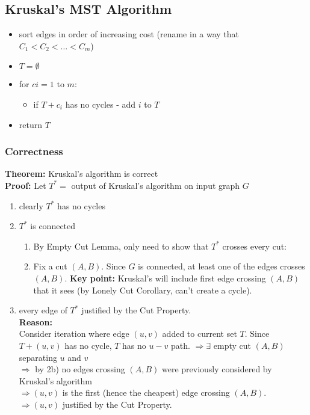 \documentclass{scrartcl}
\begin{document}
\subsection{Kruskal's MST Algorithm}
\label{sec:6-1}
\begin{itemize}
\item sort edges in order of increasing cost (rename in a way that $C_1 < C_2 <
  \dots < C_m$)
\item $T = \emptyset$
\item for $ci = 1$ to $m$:
  \begin{itemize}
  \item if $T + c_i$ has no cycles - add $i$ to $T$
  \end{itemize}
\item return $T$
\end{itemize}
\subsubsection{Correctness}
\label{sec:6-2}
{\bf Theorem: } Kruskal's algorithm is correct \\
{\bf Proof: } Let $T^* = $ output of Kruskal's algorithm on input graph $G$ \\
\begin{enumerate}
\item clearly $T^*$ has no cycles
\item $T^*$ is connected
  \begin{enumerate}
  \item By Empty Cut Lemma, only need to show that $T^*$ crosses every cut:
  \item Fix a cut $(A, B)$. Since $G$ is connected, at least one of the edges
    crosses $(A, B)$. {\bf Key point: } Kruskal's will include first edge
    crossing $(A, B)$ that it sees (by Lonely Cut Corollary, can't create a
    cycle).
  \end{enumerate}
\item every edge of $T^*$ justified by the Cut Property. \\
  {\bf Reason: }  \\
  Consider iteration where edge $(u, v)$ added to current set $T$. Since $T +
  (u, v)$ has no cycle, $T$ has no $u-v$ path. $\Rightarrow \exists$ empty cut
  $(A, B)$ separating $u$ and $v$ \\
  $\Rightarrow$ by 2b) no edges crossing $(A, B)$ were previously considered by
  Kruskal's algorithm \\
  $\Rightarrow (u, v)$ is the first (hence the cheapest) edge crossing $(A, B)$.
  $\Rightarrow (u, v)$ justified by the Cut Property.
\end{enumerate}
\end{document}
